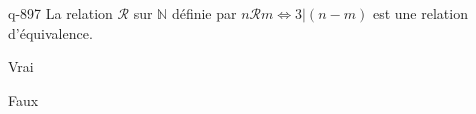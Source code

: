 \begin{truefalse}{q-897}
La relation $\mathcal R$ sur $\mathbb N$ définie par $n\mathcal R m \iff 3 | (n-m)$ est une relation d'équivalence.
\item* Vrai
\item Faux
\end{truefalse}

